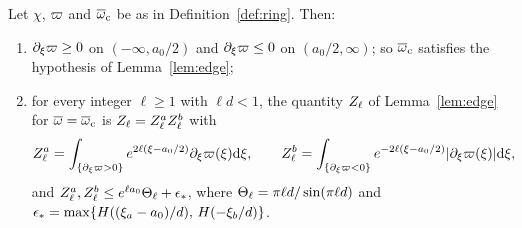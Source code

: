 \begin{lemma}
\label{lem:closed-form}
Let $\chi$, $\varpi$ and $\overline{\omega}_{\mathrm{c}}$ be as in Definition~\ref{def:ring}. Then:
\begin{enumerate}[label=\textup{(\arabic*)}]
\item $\partial_\xi\varpi\ge0$ on $(-\infty,a_0/2)$ and $\partial_\xi\varpi\le0$ on $(a_0/2,\infty)$; so
  $\overline{\omega}_{\mathrm{c}}$ satisfies the hypothesis of Lemma~\ref{lem:edge};
\item for every integer $\ell\ge1$ with $\ell d<1$, the quantity $Z_\ell$ of
  Lemma~\ref{lem:edge} for $\overline{\omega}=\overline{\omega}_{\mathrm{c}}$ is $Z_\ell=Z^a_\ell Z^b_\ell$ with
  \[
  Z^a_\ell=\int_{\{\partial_\xi\varpi>0\}}e^{2\ell(\xi-a_0/2)}\partial_\xi\varpi(\xi)\dd\xi,\qquad
  Z^b_\ell=\int_{\{\partial_\xi\varpi<0\}}e^{-2\ell(\xi-a_0/2)}|\partial_\xi\varpi(\xi)|\dd\xi,
  \]
  and $Z^a_\ell,Z^b_\ell\le e^{\ell a_0}\Theta_{\ell}+\epsilon_*$, where
  $\Theta_{\ell}=\pi\ell d/\sin(\pi\ell d)$ and
  $\epsilon_*=\max\{H((\xi_a-a_0)/d),\,H(-\xi_b/d)\}$.
\end{enumerate}
\end{lemma}
